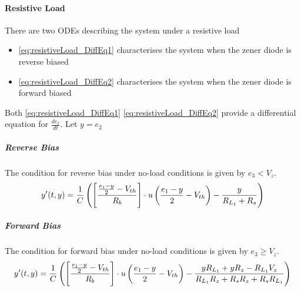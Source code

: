 \paragraph{Resistive Load}
There are two ODEs describing the system under a resistive load
\begin{itemize}
	\item \eqref{eq:resistiveLoad_DiffEq1} characterises the system when the zener diode is reverse biased
	\item \eqref{eq:resistiveLoad_DiffEq2} characterises the system when the zener diode is forward biased
\end{itemize}
Both \eqref{eq:resistiveLoad_DiffEq1} \eqref{eq:resistiveLoad_DiffEq2} provide a differential equation for $\frac{de_2}{dt}$. Let $y = e_2$

\subparagraph{Reverse Bias}
The condition for reverse bias under no-load conditions is given by $e_3 < V_z$.
\begin{equation}
	y'(t,y) = \frac{1}{C}\left(\left[\frac{\frac{e_1 - y}{2} - V_{th}}{R_b} \right]\cdot u\left(\frac{e_1 - y}{2} - V_{th} \right) - \frac{y}{R_{L_1} + R_s} \right)
\end{equation}
\subparagraph{Forward Bias}
The condition for forward bias under no-load conditions is given by $e_3 \geq V_z$.  
\begin{equation}
	y'(t,y) = \frac{1}{C}\left(\left[\frac{\frac{e_1 - y}{2} - V_{th}}{R_b} \right]\cdot u\left(\frac{e_1 - y}{2} - V_{th} \right) - \frac{y R_{L_1} + y R_z - R_{L_1} V_z}{R_{L_1} R_z + R_s R_z + R_s R_{L_1}} \right)
\end{equation}